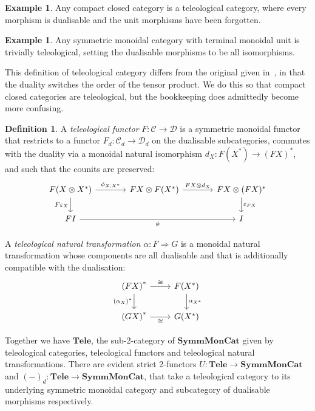 \documentclass[11pt,letterpaper]{article}
\theoremstyle{plain}
\theoremstyle{definition}
\newtheorem{definition}[theorem]{Definition}
\newtheorem{example}[theorem]{Example}
\newcommand{\C}{\mathscr{C}}
\newcommand{\D}{\mathscr{D}}
\newcommand{\SymmMonCat}{\mathbf{SymmMonCat}}
\newcommand{\Tele}{\mathbf{Tele}}
\newcommand{\todo}[1]{\textcolor{red}{\small #1}}
\begin{document}
\begin{example}
  Any compact closed category is a teleological category, where every morphism is dualisable and the unit morphisms have been forgotten.
\end{example}
\begin{example}
  Any symmetric monoidal category with terminal monoidal unit is trivially teleological, setting the dualisable morphisms to be all isomorphisms.
\end{example}

This definition of teleological category differs from the original given in~\cite{CoherenceForLenses}, in that the duality switches the order of the tensor product. We do this so that compact closed categories are teleological, but the bookkeeping does admittedly become more confusing.



\begin{definition}
  A \emph{teleological functor} $F : \C \to \D$ is a symmetric monoidal functor that restricts to a functor $F_d : \C_d \to \D_d$ on the dualisable subcategories, commutes with the duality via a monoidal natural isomorphism $d_X : F(X^*) \to {(FX)}^*$, and such that the counits are preserved:
  \[
   \begin{tikzcd}[column sep = large]
    F(X \otimes X^*) \ar[r, "\phi_{X, X^*}"]  \ar[d, "F\varepsilon_X", swap] & FX \otimes F(X^*) \ar[r, "FX \otimes d_X"] & FX \otimes (FX)^* \ar[d, "\varepsilon_{FX}"] \\
    FI \ar[rr, "\phi", swap] & & I
  \end{tikzcd}
  \]

  A \emph{teleological natural transformation} $\alpha : F \Rightarrow G$ is a monoidal natural transformation whose components are all dualisable and that is additionally compatible with the dualisation:
  \[
  \begin{tikzcd}
    {(FX)}^* \ar[r, "\cong"]  \ar[d, "(\alpha_X)^*", swap] & F(X^*) \ar[d, "\alpha_{X^*}"] \\
    {(GX)}^* \ar[r, "\cong", swap] & G(X^*)
  \end{tikzcd}
  \]
\end{definition}

Together we have $\Tele$, the sub-2-category of $\SymmMonCat$ given by teleological categories, teleological functors and teleological natural transformations. There are evident strict 2-functors $U : \Tele \to \SymmMonCat$ and ${(-)}_d : \Tele \to \SymmMonCat$, that take a teleological category to its underlying symmetric monoidal category and subcategory of dualisable morphisms respectively.
\end{document}
